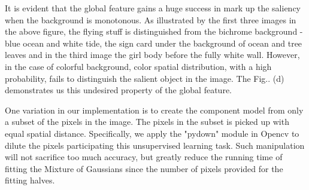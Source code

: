 \documentclass[10pt,twocolumn,letterpaper]{article}
\begin{document}
    It is evident that the global feature gains a huge success in mark up the saliency when the background
    is monotonous. As illustrated by the first three images in the above figure, the flying stuff
    is distinguished from the bichrome background - blue ocean and white tide, the sign card under the 
    background of ocean and tree leaves and in the third image the girl body before the fully white wall.
    However, in the case of colorful background, color spatial distribution, with a high probability,
    fails to distinguish the salient object in the image. The Fig.. (d) demonstrates us
    this undesired property of the global feature. 

    One variation in our implementation is to create the component model from only a subset of the pixels in the image.
    The pixels in the subset is picked up with equal spatial distance. Specifically, we apply the "pydown" module 
    in Opencv to dilute the pixels participating this unsupervised learning task.
    Such manipulation will not sacrifice too much accuracy, but greatly reduce 
    the running time of fitting the Mixture of Gaussians since the number of pixels provided for the fitting halves. 
\end{document}
